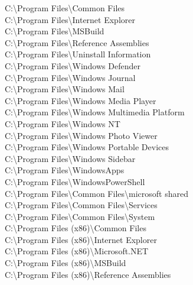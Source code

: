 \noindent C:\textbackslash Program Files\textbackslash Common Files \\
C:\textbackslash Program Files\textbackslash Internet Explorer \\
C:\textbackslash Program Files\textbackslash MSBuild \\
C:\textbackslash Program Files\textbackslash Reference Assemblies \\
C:\textbackslash Program Files\textbackslash Uninstall Information \\
C:\textbackslash Program Files\textbackslash Windows Defender \\
C:\textbackslash Program Files\textbackslash Windows Journal \\
C:\textbackslash Program Files\textbackslash Windows Mail \\
C:\textbackslash Program Files\textbackslash Windows Media Player \\
C:\textbackslash Program Files\textbackslash Windows Multimedia Platform \\
C:\textbackslash Program Files\textbackslash Windows NT \\
C:\textbackslash Program Files\textbackslash Windows Photo Viewer \\
C:\textbackslash Program Files\textbackslash Windows Portable Devices \\
C:\textbackslash Program Files\textbackslash Windows Sidebar \\
C:\textbackslash Program Files\textbackslash WindowsApps \\
C:\textbackslash Program Files\textbackslash WindowsPowerShell \\
C:\textbackslash Program Files\textbackslash Common Files\textbackslash microsoft shared \\
C:\textbackslash Program Files\textbackslash Common Files\textbackslash Services \\
C:\textbackslash Program Files\textbackslash Common Files\textbackslash System \\
C:\textbackslash Program Files (x86)\textbackslash Common Files \\
C:\textbackslash Program Files (x86)\textbackslash Internet Explorer \\
C:\textbackslash Program Files (x86)\textbackslash Microsoft.NET \\
C:\textbackslash Program Files (x86)\textbackslash MSBuild \\
C:\textbackslash Program Files (x86)\textbackslash Reference Assemblies \\

